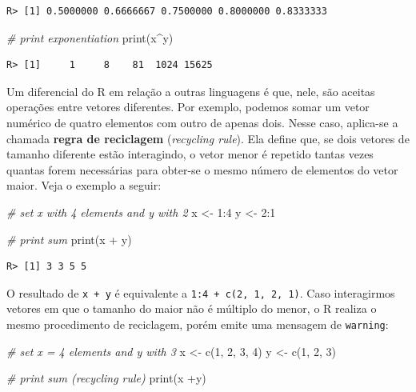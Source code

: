 \documentclass[
  11pt,
]{book}
\newenvironment{Shaded}{\begin{snugshade}}{\end{snugshade}}
\newcommand{\CommentTok}[1]{\textcolor[rgb]{0.37,0.37,0.37}{\textit{#1}}}
\newcommand{\DecValTok}[1]{\textcolor[rgb]{0.06,0.06,0.06}{#1}}
\newcommand{\FunctionTok}[1]{\textcolor[rgb]{0,0,0}{#1}}
\newcommand{\NormalTok}[1]{#1}
\newcommand{\OtherTok}[1]{\textcolor[rgb]{0.37,0.37,0.37}{#1}}
\newcommand{\SpecialCharTok}[1]{\textcolor[rgb]{0,0,0}{#1}}
\begin{document}
\begin{verbatim}
R> [1] 0.5000000 0.6666667 0.7500000 0.8000000 0.8333333
\end{verbatim}

\begin{Shaded}
\begin{Highlighting}[]
\CommentTok{\# print exponentiation}
\FunctionTok{print}\NormalTok{(x}\SpecialCharTok{\^{}}\NormalTok{y)}
\end{Highlighting}
\end{Shaded}

\begin{verbatim}
R> [1]     1     8    81  1024 15625
\end{verbatim}

Um diferencial do R em relação a outras linguagens é que, nele, são aceitas operações entre vetores diferentes. Por exemplo, podemos somar um vetor numérico de quatro elementos com outro de apenas dois. Nesse caso, aplica-se a chamada \textbf{regra de reciclagem} (\emph{recycling rule}). Ela define que, se dois vetores de tamanho diferente estão interagindo, o vetor menor é repetido tantas vezes quantas forem necessárias para obter-se o mesmo número de elementos do vetor maior. Veja o exemplo a seguir:

\begin{Shaded}
\begin{Highlighting}[]
\CommentTok{\# set x with 4 elements and y with 2}
\NormalTok{x }\OtherTok{\textless{}{-}} \DecValTok{1}\SpecialCharTok{:}\DecValTok{4}
\NormalTok{y }\OtherTok{\textless{}{-}} \DecValTok{2}\SpecialCharTok{:}\DecValTok{1}

\CommentTok{\# print sum}
\FunctionTok{print}\NormalTok{(x }\SpecialCharTok{+}\NormalTok{ y)}
\end{Highlighting}
\end{Shaded}

\begin{verbatim}
R> [1] 3 3 5 5
\end{verbatim}

O resultado de \texttt{x\ +\ y} é equivalente a \texttt{1:4\ +\ c(2,\ 1,\ 2,\ 1)}. Caso interagirmos vetores em que o tamanho do maior não é múltiplo do menor, o R realiza o mesmo procedimento de reciclagem, porém emite uma mensagem de \texttt{warning}:

\begin{Shaded}
\begin{Highlighting}[]
\CommentTok{\# set x = 4 elements and y with 3}
\NormalTok{x }\OtherTok{\textless{}{-}} \FunctionTok{c}\NormalTok{(}\DecValTok{1}\NormalTok{, }\DecValTok{2}\NormalTok{, }\DecValTok{3}\NormalTok{, }\DecValTok{4}\NormalTok{)}
\NormalTok{y }\OtherTok{\textless{}{-}} \FunctionTok{c}\NormalTok{(}\DecValTok{1}\NormalTok{, }\DecValTok{2}\NormalTok{, }\DecValTok{3}\NormalTok{)}

\CommentTok{\# print sum (recycling rule)}
\FunctionTok{print}\NormalTok{(x }\SpecialCharTok{+}\NormalTok{y)}
\end{Highlighting}
\end{Shaded}
\end{document}
